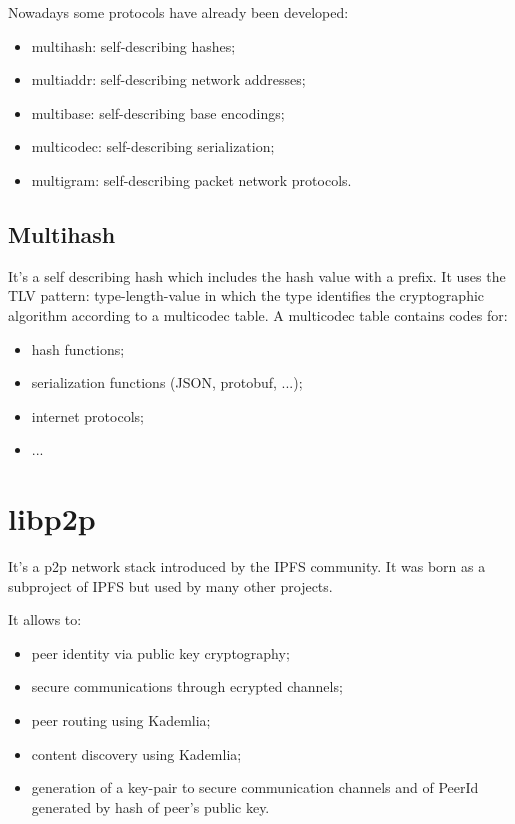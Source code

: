 Nowadays some protocols have already been developed:
\begin{itemize}
    \item multihash: self-describing hashes;
    \item multiaddr: self-describing network addresses;
    \item multibase: self-describing base encodings;
    \item multicodec: self-describing serialization;
    \item multigram: self-describing packet network protocols.
\end{itemize}

\subsection{Multihash}
It's a self describing hash which includes the hash value with a prefix.
It uses the TLV pattern: type-length-value in which the type identifies the cryptographic algorithm according to a multicodec table.
A multicodec table contains codes for:
\begin{itemize}
    \item hash functions;
    \item serialization functions (JSON, protobuf, ...);
    \item internet protocols;
    \item ...
\end{itemize}


\section{libp2p}
It's a p2p network stack introduced by the IPFS community.
It was born as a subproject of IPFS but used by many other projects.

It allows to:
\begin{itemize}
    \item peer identity via public key cryptography;
    \item secure communications through ecrypted channels;
    \item peer routing using Kademlia;
    \item content discovery using Kademlia;
    \item generation of a key-pair to secure communication channels and of PeerId generated by hash of peer's public key.
\end{itemize}






